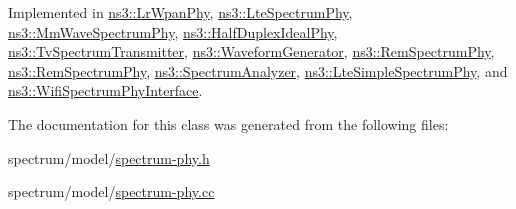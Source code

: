 Implemented in \hyperlink{classns3_1_1LrWpanPhy_a0009842c2fb1be73d1ad437ca0e28b73}{ns3\+::\+Lr\+Wpan\+Phy}, \hyperlink{classns3_1_1LteSpectrumPhy_af4041e1ab1f466d1c66b8f2f1c519657}{ns3\+::\+Lte\+Spectrum\+Phy}, \hyperlink{classns3_1_1MmWaveSpectrumPhy_ab4e138db0344c04c7a6b4cb48c0cf3b8}{ns3\+::\+Mm\+Wave\+Spectrum\+Phy}, \hyperlink{classns3_1_1HalfDuplexIdealPhy_aa2d9a411ba82c4bbd77a2e5a0bc2657f}{ns3\+::\+Half\+Duplex\+Ideal\+Phy}, \hyperlink{classns3_1_1TvSpectrumTransmitter_ae913f36cda537d9f0834c7ed0d974745}{ns3\+::\+Tv\+Spectrum\+Transmitter}, \hyperlink{classns3_1_1WaveformGenerator_a019a2938bf0c2d6f7228d5b79b8a8739}{ns3\+::\+Waveform\+Generator}, \hyperlink{classns3_1_1RemSpectrumPhy_a9ddd325516aae88f04bd688c08a27e0d}{ns3\+::\+Rem\+Spectrum\+Phy}, \hyperlink{classns3_1_1RemSpectrumPhy_a9ddd325516aae88f04bd688c08a27e0d}{ns3\+::\+Rem\+Spectrum\+Phy}, \hyperlink{classns3_1_1SpectrumAnalyzer_a53e7653b1e80117e239f2fee268c1225}{ns3\+::\+Spectrum\+Analyzer}, \hyperlink{classns3_1_1LteSimpleSpectrumPhy_afcf7377f41c3ae69428d9c2037972183}{ns3\+::\+Lte\+Simple\+Spectrum\+Phy}, and \hyperlink{classns3_1_1WifiSpectrumPhyInterface_a30e2efbacd400ef27f4a0bfb501bf940}{ns3\+::\+Wifi\+Spectrum\+Phy\+Interface}.



The documentation for this class was generated from the following files\+:\begin{DoxyCompactItemize}
\item 
spectrum/model/\hyperlink{spectrum-phy_8h}{spectrum-\/phy.\+h}\item 
spectrum/model/\hyperlink{spectrum-phy_8cc}{spectrum-\/phy.\+cc}\end{DoxyCompactItemize}
